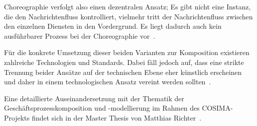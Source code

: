   Choreographie verfolgt also einen dezentralen Ansatz; Es gibt nicht eine Instanz, die den Nachrichtenfluss kontrolliert, vielmehr tritt der Nachrichtenfluss zwischen den einzelnen Diensten in den Vordergrund. Es liegt dadurch auch kein ausführbarer Prozess bei der Choreographie vor~\citep[S. 46]{peltz2003wso}.
  
  Für die konkrete Umsetzung dieser beiden Varianten zur Komposition existieren zahlreiche Technologien und Standards. Dabei fäll jedoch auf, dass eine strikte Trennung beider Ansätze auf der technischen Ebene eher künstlich erscheinen und daher in einem technologischen Ansatz vereint werden sollten~\citep[S. 42]{papazoglou2007soc}.
  
  Eine detaillierte Auseinandersetzung mit der Thematik der Geschäftsprozesskomposition und -modellierung im Rahmen des COSIMA-Projekts findet sich in der Master Thesis von Matthias Richter~\citep{samma08}.



% 


  
